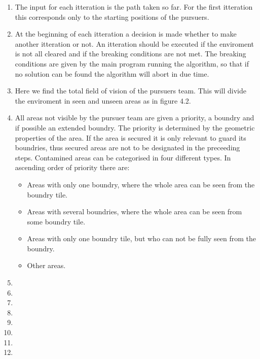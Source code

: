 \begin{enumerate}
\item{} The input for each itteration is the path taken so far. For the first itteration this corresponds only to the starting positions of the pursuers.
\item{} At the beginning of each itteration a decision is made whether to make another itteration or not. An itteration should be executed if the enviroment is not all cleared and if the breaking conditions are not met. The breaking conditions are given by the main program running the algorithm, so that if no solution can be found the algorithm will abort in due time.   
\item{} Here we find the total field of vision of the pursuers team. This will divide the enviroment in seen and unseen areas as in figure 4.2.   
\item{} All areas not visible by the pursuer team are given a priority, a boundry and if possible an extended boundry. The priority is determined by the geometric properties of the area. If the area is secured it is only relevant to guard its boundries, thus secured areas are not to be designated in the preceeding steps. Contamined areas can be categorised in four different types. In ascending order of priority there are:
\begin{itemize} 
\item{}Areas with only one boundry, where the whole area can be seen from the boundry tile.
\item{}Areas with several boundries, where the whole area can be seen from some boundry tile. 
\item{}Areas with only one boundry tile, but who can not be fully seen from the boundry.
\item{}Other areas.
\end{itemize}
\item{}
\item{}
\item{}
\item{}
\item{}
\item{}
\item{}
\item{}

\end{enumerate}



